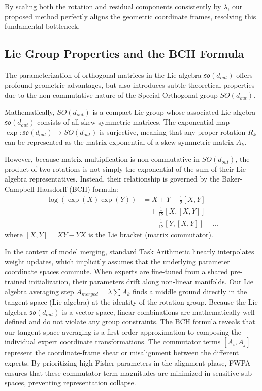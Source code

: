 \documentclass{article}
\theoremstyle{plain}
\theoremstyle{definition}
\theoremstyle{remark}
\begin{document}
By scaling both the rotation and residual components consistently by $\lambda$, our proposed method perfectly aligns the geometric coordinate frames, resolving this fundamental bottleneck.

\subsection{Lie Group Properties and the BCH Formula}
The parameterization of orthogonal matrices in the Lie algebra $\mathfrak{so}(d_{out})$ offers profound geometric advantages, but also introduces subtle theoretical properties due to the non-commutative nature of the Special Orthogonal group $SO(d_{out})$. 

Mathematically, $SO(d_{out})$ is a compact Lie group whose associated Lie algebra $\mathfrak{so}(d_{out})$ consists of all skew-symmetric matrices. The exponential map $\exp: \mathfrak{so}(d_{out}) \to SO(d_{out})$ is surjective, meaning that any proper rotation $R_k$ can be represented as the matrix exponential of a skew-symmetric matrix $A_k$. 

However, because matrix multiplication is non-commutative in $SO(d_{out})$, the product of two rotations is not simply the exponential of the sum of their Lie algebra representatives. Instead, their relationship is governed by the Baker-Campbell-Hausdorff (BCH) formula:
\begin{align}
    \log(\exp(X) \exp(Y)) &= X + Y + \frac{1}{2}[X, Y] \nonumber \\
    &\quad + \frac{1}{12}[X, [X, Y]] \nonumber \\
    &\quad - \frac{1}{12}[Y, [X, Y]] + \dots
\end{align}
where $[X, Y] = XY - YX$ is the Lie bracket (matrix commutator). 

In the context of model merging, standard Task Arithmetic linearly interpolates weight updates, which implicitly assumes that the underlying parameter coordinate spaces commute. When experts are fine-tuned from a shared pre-trained initialization, their parameters drift along non-linear manifolds. Our Lie algebra averaging step $A_{merged} = \lambda \sum A_k$ finds a middle ground directly in the tangent space (Lie algebra) at the identity of the rotation group. Because the Lie algebra $\mathfrak{so}(d_{out})$ is a vector space, linear combinations are mathematically well-defined and do not violate any group constraints. The BCH formula reveals that our tangent-space averaging is a first-order approximation to composing the individual expert coordinate transformations. The commutator terms $[A_i, A_j]$ represent the coordinate-frame shear or misalignment between the different experts. By prioritizing high-Fisher parameters in the alignment phase, FWPA ensures that these commutator term magnitudes are minimized in sensitive sub-spaces, preventing representation collapse.
\end{document}
